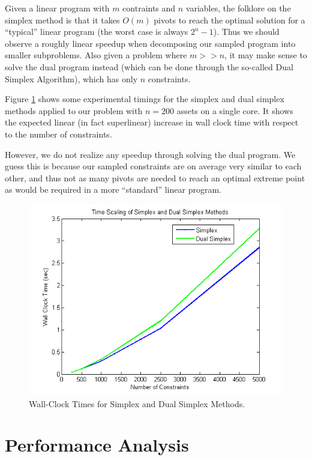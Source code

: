 \documentclass[12pt]{article}
\begin{document}
Given a linear program with $m$ contraints and $n$ variables, the folklore on the simplex method is that it takes $O(m)$ pivots to reach the optimal solution for a ``typical'' linear program (the worst case is always $2^n - 1$).
Thus we should observe a roughly linear speedup when decomposing our sampled program into smaller subproblems.
Also given a problem where $m >> n$, it may make sense to solve the dual program instead (which can be done through the so-called Dual Simplex Algorithm), which has only $n$ constraints.

Figure \ref{fig:fig_simplex_time} shows some experimental timings for the simplex and dual simplex methods applied to our problem with $n = 200$ assets on a single core.
It shows the expected linear (in fact superlinear) increase in wall clock time with respect to the number of constraints.

However, we do not realize any speedup through solving the dual program.  
We guess this is because our sampled constraints are on average very similar to each other, and thus not as many pivots are needed to reach an optimal extreme point as would be required in a more ``standard'' linear program.

\begin{figure}[ht]
	\centering
		\includegraphics[scale=0.9]{../plot/figs/fig_simplex_time.png}
	\caption{Wall-Clock Times for Simplex and Dual Simplex Methods.}
	\label{fig:fig_simplex_time}
\end{figure}

\section*{Performance Analysis}
\end{document}
